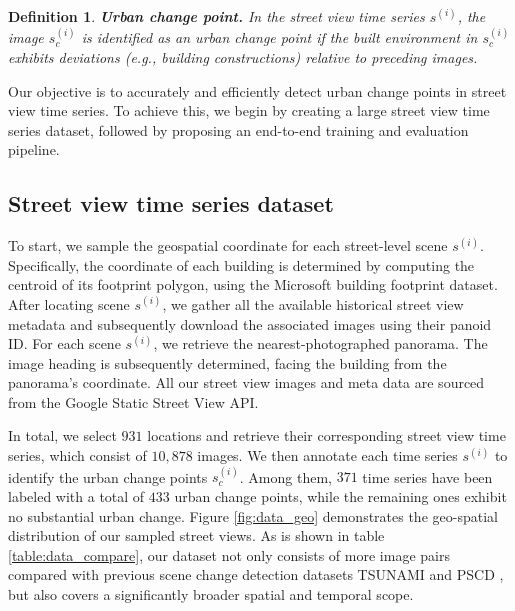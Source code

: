 \documentclass[letterpaper]{article} %
\newtheorem{definition}{Definition}
\begin{document}
\begin{definition}
\textbf{Urban change point.}
In the street view time series $s^{(i)}$, the image $s^{(i)}_{c}$ is identified as an urban change point if the built environment in $s^{(i)}_{c}$ exhibits deviations (e.g., building constructions) relative to preceding images.
\end{definition}

Our objective is to accurately and efficiently detect urban change points in street view time series. To achieve this, we begin by creating a large street view time series dataset, followed by proposing an end-to-end training and evaluation pipeline.

\subsection{Street view time series dataset}
To start, we sample the geospatial coordinate for each street-level scene $s^{(i)}$. Specifically, the coordinate of each building is determined by computing the centroid of its footprint polygon, using the Microsoft building footprint dataset.
After locating scene $s^{(i)}$, we gather all the available historical street view metadata and subsequently download the associated images using their panoid ID. For each scene $s^{(i)}$, we retrieve the nearest-photographed panorama. The image heading is subsequently determined, facing the building from the panorama's coordinate. All our street view images and meta data are sourced from the Google Static Street View API.


In total, we select $931$ locations and retrieve their corresponding street view time series, which consist of $10,878$ images. We then annotate each time series $s^{(i)}$ to identify the urban change points $s_c^{(i)}$. Among them, $371$ time series have been labeled with a total of $433$ urban change points, while the remaining ones exhibit no substantial urban change. Figure \ref{fig:data_geo} demonstrates the geo-spatial distribution of our sampled street views.
As is shown in table \ref{table:data_compare}, our dataset not only consists of more image pairs compared with previous scene change detection datasets TSUNAMI \cite{Sakurada2015ChangeDF} and PSCD \cite{sakurada2020weakly}, but also covers a significantly broader spatial and temporal scope.
\end{document}
